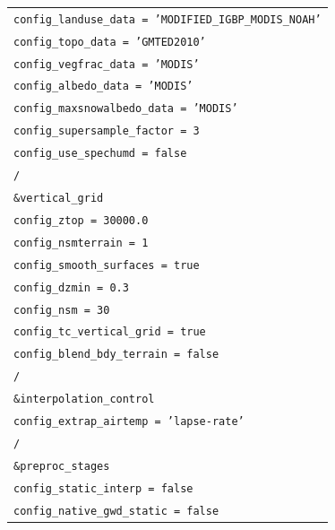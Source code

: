 \documentclass[12pt,a4paper,oneside]{book}
\providecommand{\arraybackslash}{\tabularnewline}
\begin{document}
\begin{longtable}[]{@{}
  >{\raggedright\arraybackslash}p{}@{}}
\texttt{\hspace*{1em}config\_landuse\_data = 'MODIFIED\_IGBP\_MODIS\_NOAH'} \\
\texttt{\hspace*{1em}config\_topo\_data = 'GMTED2010'} \\
\texttt{\hspace*{1em}config\_vegfrac\_data = 'MODIS'} \\
\texttt{\hspace*{1em}config\_albedo\_data = 'MODIS'} \\
\texttt{\hspace*{1em}config\_maxsnowalbedo\_data = 'MODIS'} \\
\texttt{\hspace*{1em}config\_supersample\_factor = 3} \\
\texttt{\hspace*{1em}config\_use\_spechumd = false} \\
\texttt{/} \\
\texttt{\&vertical\_grid} \\
\texttt{\hspace*{1em}config\_ztop = 30000.0} \\
\texttt{\hspace*{1em}config\_nsmterrain = 1} \\
\texttt{\hspace*{1em}config\_smooth\_surfaces = true} \\
\texttt{\hspace*{1em}config\_dzmin = 0.3} \\
\texttt{\hspace*{1em}config\_nsm = 30} \\
\texttt{\hspace*{1em}config\_tc\_vertical\_grid = true} \\
\texttt{\hspace*{1em}config\_blend\_bdy\_terrain = false} \\
\texttt{/} \\
\texttt{\&interpolation\_control} \\
\texttt{\hspace*{1em}config\_extrap\_airtemp = 'lapse-rate'} \\
\texttt{/} \\
\texttt{\&preproc\_stages} \\
\texttt{\hspace*{1em}config\_static\_interp = false} \\
\texttt{\hspace*{1em}config\_native\_gwd\_static = false} \\

\end{longtable}
\end{document}
